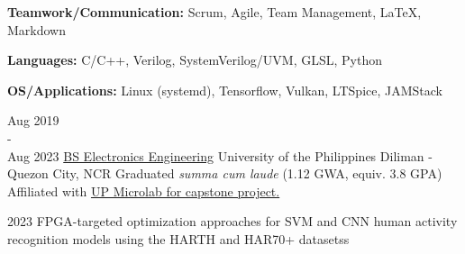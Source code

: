 \documentclass[9pt]{developercv}
\begin{document}
\hfill 
\begin{minipage}[t]{0.475\textwidth} 
	\vspace{-\baselineskip}


	\textbf{Teamwork/Communication:} Scrum, Agile, Team Management, LaTeX, Markdown

	\textbf{Languages:} C/C++, Verilog, SystemVerilog/UVM, GLSL, Python

	\textbf{OS/Applications:} Linux (systemd), Tensorflow, Vulkan, LTSpice, JAMStack


	
	\begin{entrylist}
		\entry
			{Aug 2019 \\ - \\ Aug 2023}
			{\href{https://www.eee.upd.edu.ph/undergraduate-programs/bs-electronics-and-communications-engineering}{BS Electronics Engineering}}
			{University of the Philippines Diliman - Quezon City, NCR}
			{Graduated \emph{summa cum laude} (1.12 GWA, equiv. 3.8 GPA)\\
			Affiliated with \href{https://www.up-microlab.org/}{UP Microlab for capstone project.}}
	\end{entrylist}
	\begin{entrylist}
		\entry
			{2023}
			{FPGA-targeted optimization approaches for SVM and CNN human activity recognition models using the HARTH and HAR70+ datasetss}

\end{entrylist}
\end{minipage}
\end{document}
